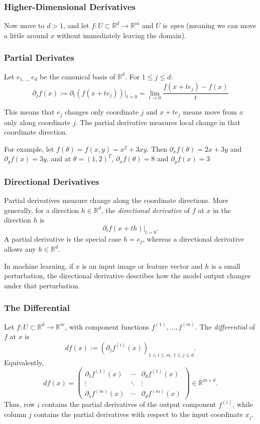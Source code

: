\documentclass[12pt,oneside]{book}
\numberwithin{equation}{section}
\theoremstyle{definition}
\theoremstyle{plain}
\theoremstyle{remark}
\newcommand{\R}{\mathbb{R}}
\begin{document}
\subsubsection{Higher-Dimensional Derivatives}
Now move to $d > 1$, and let $f: U \subset \R^d \rightarrow \R^m$ and $U$ is \emph{open} (meaning we can move a little around $x$ without immediately leaving the domain).

\subsubsection{Partial Derivates}
Let $e_{1,...,}e_d$ be the canonical basis of $\R^d$. For $1 \le j \le d$: \[\partial_jf(x) := \partial_t(f(x+te_j))|_{t=0}=\lim_{t\rightarrow 0}\frac{f(x+te_j)-f(x)}{t}\]

This means that $e_j$ changes only coordinate $j$ and $x+te_j$ means move from $x$ only along coordinate $j$. The partial derivative measures local change in that coordinate direction. 

For example, let $f(\theta)=f(x,y)=x^2+3xy$. Then $\partial_x f(\theta)=2x+3y$ and $\partial_y f(x)=3y$, and at $\theta = (1,2)^T$, $\partial_x f(\theta)=8$ and $\partial_y f(x)=3$

\subsubsection{Directional Derivatives}
Partial derivatives measure change along the coordinate directions. More generally, for a direction $h\in\R^d$, the \emph{directional derivative} of $f$ at $x$ in the direction $h$ is
\[
\left.\partial_t f(x+th)\right|_{t=0}.
\]
A partial derivative is the special case $h=e_j$, whereas a directional derivative allows any $h\in\R^d$.

In machine learning, if $x$ is an input image or feature vector and $h$ is a small perturbation, the directional derivative describes how the model output changes under that perturbation.

\subsubsection{The Differential}
Let $f\colon U\subset\R^d\to\R^m$, with component functions $f^{(1)},\ldots,f^{(m)}$. The \emph{differential} of $f$ at $x$ is
\[
df(x):=\left(\partial_j f^{(i)}(x)\right)_{
1\leq i\leq m,\,1\leq j\leq d}.
\]
Equivalently,
\[
df(x)=
\begin{pmatrix}
\partial_1 f^{(1)}(x) & \cdots & \partial_d f^{(1)}(x) \\
\vdots & \ddots & \vdots \\
\partial_1 f^{(m)}(x) & \cdots & \partial_d f^{(m)}(x)
\end{pmatrix}
\in\R^{m\times d}.
\]
Thus, row $i$ contains the partial derivatives of the output component $f^{(i)}$, while column $j$ contains the partial derivatives with respect to the input coordinate $x_j$.
\end{document}

